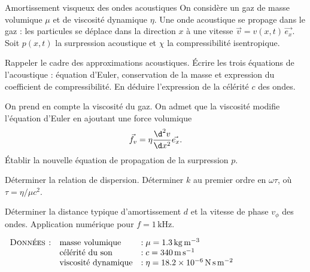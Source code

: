 \begin{exo}[PSI]{Amortissement visqueux des ondes acoustiques}
On considère un gaz de masse volumique $\mu$ et de viscosité dynamique $\eta$. Une onde acoustique se propage dans le gaz : les particules se déplace dans la direction $x$ à une vitesse $\vec{v}=v(x,t)\,\vec{e_{x}}$. Soit $p(x,t)$ la surpression acoustique et $\chi$ la compressibilité isentropique.

 \begin{quest}
 \item Rappeler le cadre des approximations acoustiques. Écrire les trois équations de l'acoustique : équation d'Euler, conservation de la masse et expression du coefficient de compressibilité. En déduire l’expression de la célérité $c$ des ondes.


  \item On prend en compte la viscosité du gaz. On admet que la viscosité modifie l’équation d’Euler en ajoutant une force volumique
  \begin{equation}
  \vec{f_v} = \eta \dfrac{\d^2 v}{\d x^2} \vec{e_x}.
  \end{equation}
Établir la nouvelle équation de propagation de la surpression $p$.
  \item Déterminer la relation de dispersion. Déterminer $k$ au premier ordre en $\omega\tau$, où $\tau=\eta/\mu c^{2}$.
  \item Déterminer la distance typique  d'amortissement $d$ et la vitesse de phase $v_\phi$ des ondes. Application numérique pour $f=1\,\text{kHz}$.


 \end{quest}

  $\begin{array}{lll}
\textsc{Données :}
& \text{masse volumique} & :  \mu = \SI{1.3}{kg.m^{-3}} \\
& \text{célérité du son} & : c = \SI{340}{m.s^{-1}} \\
& \text{viscosité dynamique} & : \eta=\SI{18.2e-6}{N.s.m^{-2}}
\end{array}
$

\end{exo}



